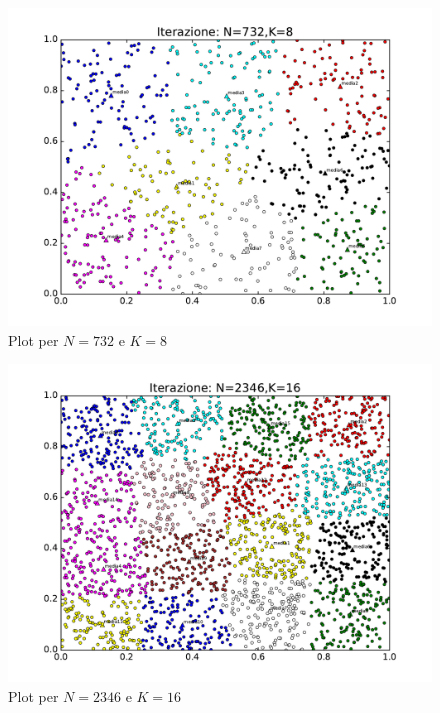 \documentclass[10pt,twocolumn,letterpaper]{article}
\begin{document}
\begin{figure}[H]
  \centering
    \includegraphics[width=\columnwidth]{Image/test.pdf}
  \caption{Plot per $N=732$ e $K=8$}
  \label{fig:test}
\end{figure}

\begin{figure}[H]
  \centering
    \includegraphics[width=\columnwidth]{Image/test2.pdf}
  \caption{Plot per $N=2346$ e $K=16$}
  \label{fig:test2}
\end{figure}
\end{document}
